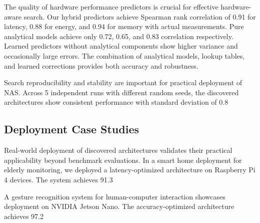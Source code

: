 \documentclass[journal]{IEEEtran}
\begin{document}
The quality of hardware performance predictors is crucial for effective hardware-aware search. Our hybrid predictors achieve Spearman rank correlation of 0.91 for latency, 0.88 for energy, and 0.94 for memory with actual measurements. Pure analytical models achieve only 0.72, 0.65, and 0.83 correlation respectively. Learned predictors without analytical components show higher variance and occasionally large errors. The combination of analytical models, lookup tables, and learned corrections provides both accuracy and robustness.

Search reproducibility and stability are important for practical deployment of NAS. Across 5 independent runs with different random seeds, the discovered architectures show consistent performance with standard deviation of 0.8%

\subsection{Deployment Case Studies}

Real-world deployment of discovered architectures validates their practical applicability beyond benchmark evaluations. In a smart home deployment for elderly monitoring, we deployed a latency-optimized architecture on Raspberry Pi 4 devices. The system achieves 91.3%

A gesture recognition system for human-computer interaction showcases deployment on NVIDIA Jetson Nano. The accuracy-optimized architecture achieves 97.2%
\end{document}
